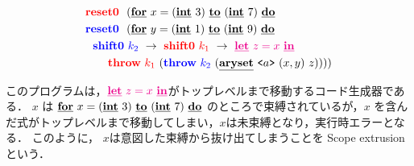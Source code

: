 \begin{align*}
  &\red{\Resetz} ~~(\cforin{x=(\cint~3)}{(\cint~7)} \\
  &\blue{\Resetz} ~~(\cforin{y=(\cint~1)}{(\cint~9)} \\
  &~~\blue{\Shiftz}~\blue{k_2}~\to~ \red{\Shiftz}~\red{k_1}~\to~ \magenta{\cLet~z=x~\cIn} \\
  &~~~~~~
    \red{\Throw}~\red{k_1}~(\blue{\Throw}~\blue{k_2}~(\caryset{\code{a}}{(x,y)}{z}))))
\end{align*}

このプログラムは，$\magenta{\cLet~z=x~\cIn}$がトップレベルまで移動するコード生成器である．
$x$ は $\cforin{x=(\cint~3)}{(\cint~7)}$ のところで束縛されているが，$x$ を含んだ式がトップレベルまで移動してしまい，$x$は未束縛となり，実行時エラーとなる．
このように， $x$は意図した束縛から抜け出てしまうことを Scope extrusion という．

